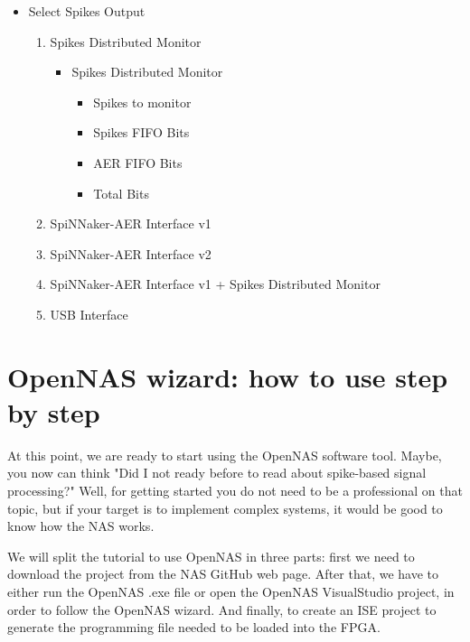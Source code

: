 \begin{itemize}
    \item Select Spikes Output
        \begin{enumerate}
            \item Spikes Distributed Monitor
                \begin{itemize}
                    \item Spikes Distributed Monitor
                        \begin{itemize}
                            \item Spikes to monitor
                            \item Spikes FIFO Bits
                            \item AER FIFO Bits
                            \item Total Bits
                        \end{itemize}
                \end{itemize}
            \item SpiNNaker-AER Interface v1
            
            \item SpiNNaker-AER Interface v2
            
            \item SpiNNaker-AER Interface v1 + Spikes Distributed Monitor
            
            \item USB Interface
            
        \end{enumerate}
\end{itemize}

\section{OpenNAS wizard: how to use step by step}
\label{sec:Steps}

At this point, we are ready to start using the OpenNAS software tool. Maybe, you now can think "Did I not ready before to read about spike-based signal processing?" Well, for getting started you do not need to be a professional on that topic, but if your target is to implement complex systems, it would be good to know how the NAS works.

We will split the tutorial to use OpenNAS in three parts: first we need to download the project from the NAS GitHub web page. After that, we have to either run the OpenNAS .exe file or open the OpenNAS VisualStudio project, in order to follow the OpenNAS wizard. And finally, to create an ISE project to generate the programming file needed to be loaded into the FPGA. 


